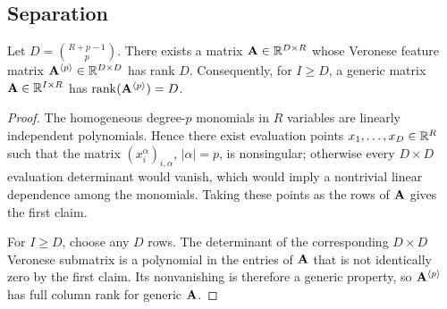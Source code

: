 \subsection{Separation}
\label{app:separation}

\begin{lemma}
\label{lem:veronese-full-rank}
Let \(D=\binom{R+p-1}{p}\). There exists a matrix \(\mathbf{A}\in\mathbb{R}^{D\times R}\)
whose Veronese feature matrix \(\mathbf{A}^{\langle p\rangle}\in\mathbb{R}^{D\times D}\)
has rank \(D\). Consequently, for \(I\ge D\), a generic matrix
\(\mathbf{A}\in\mathbb{R}^{I\times R}\) has \(\operatorname{rank}(\mathbf{A}^{\langle p\rangle})=D\).
\end{lemma}

\begin{proof}
The homogeneous degree-\(p\) monomials in \(R\) variables are linearly
independent polynomials. Hence there exist evaluation points
\(x_1,\ldots,x_D\in\mathbb{R}^R\) such that the matrix
\((x_i^\alpha)_{i,\alpha}\), \(|\alpha|=p\), is nonsingular; otherwise every
\(D\times D\) evaluation determinant would vanish, which would imply a
nontrivial linear dependence among the monomials. Taking these points as the
rows of \(\mathbf{A}\) gives the first claim.

For \(I\ge D\), choose any \(D\) rows. The determinant of the corresponding
\(D\times D\) Veronese submatrix is a polynomial in the entries of \(\mathbf{A}\)
that is not identically zero by the first claim. Its nonvanishing is therefore
a generic property, so \(\mathbf{A}^{\langle p\rangle}\) has full column rank for
generic \(\mathbf{A}\).
\end{proof}

